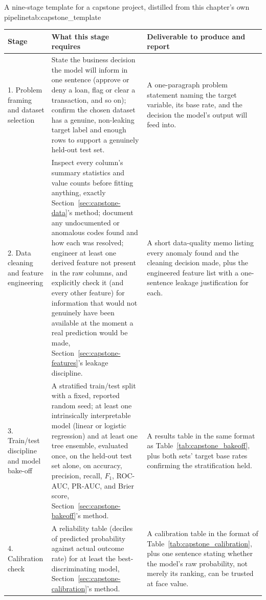 \documentclass[../ai_in_finance]{subfiles}
\begin{document}
\begin{booktable}[htbp]{A nine-stage template for a capstone project, distilled from this chapter's own pipeline}{tab:capstone_template}
\footnotesize
\begin{tabular}{L{2.1cm}L{6.9cm}L{6.1cm}}
\toprule
Stage & What this stage requires & Deliverable to produce and report \\
. Problem framing and dataset selection & State the business decision the model will inform in one sentence (approve or deny a loan, flag or clear a transaction, and so on); confirm the chosen dataset has a genuine, non-leaking target label and enough rows to support a genuinely held-out test set. & A one-paragraph problem statement naming the target variable, its base rate, and the decision the model's output will feed into. \\
2. Data cleaning and feature engineering & Inspect every column's summary statistics and value counts before fitting anything, exactly Section~\ref{sec:capstone-data}'s method; document any undocumented or anomalous codes found and how each was resolved; engineer at least one derived feature not present in the raw columns, and explicitly check it (and every other feature) for information that would not genuinely have been available at the moment a real prediction would be made, Section~\ref{sec:capstone-features}'s leakage discipline. & A short data-quality memo listing every anomaly found and the cleaning decision made, plus the engineered feature list with a one-sentence leakage justification for each. \\
3. Train/test discipline and model bake-off & A stratified train/test split with a fixed, reported random seed; at least one intrinsically interpretable model (linear or logistic regression) and at least one tree ensemble, evaluated once, on the held-out test set alone, on accuracy, precision, recall, $F_1$, ROC-AUC, PR-AUC, and Brier score, Section~\ref{sec:capstone-bakeoff}'s method. & A results table in the same format as Table~\ref{tab:capstone_bakeoff}, plus both sets' target base rates confirming the stratification held. \\
4. Calibration check & A reliability table (deciles of predicted probability against actual outcome rate) for at least the best-discriminating model, Section~\ref{sec:capstone-calibration}'s method. & A calibration table in the format of Table~\ref{tab:capstone_calibration}, plus one sentence stating whether the model's raw probability, not merely its ranking, can be trusted at face value. \\

\end{tabular}
\end{booktable}
\end{document}

